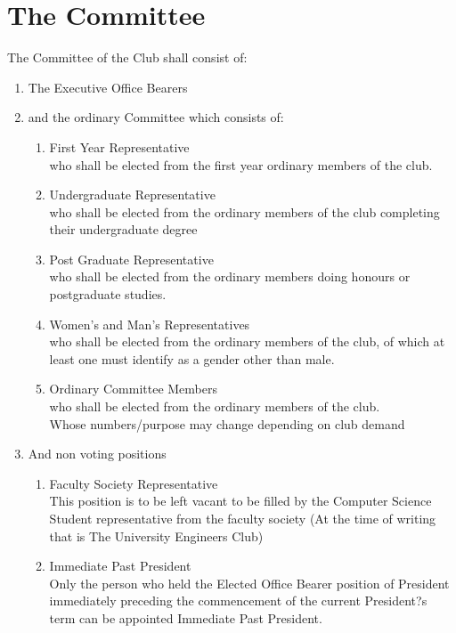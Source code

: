 \documentclass[10pt,a4paper]{report}
\begin{document}
	\section{The Committee}
	The Committee of the Club shall consist of:
	\begin{enumerate}[label=\alph*]
		\item The Executive Office Bearers
		\item and the ordinary Committee which consists of:
		\begin{enumerate}[label=\roman*]
			\item First Year Representative\\
			who shall be elected from the first year ordinary members of the club.
			\item Undergraduate Representative\\
			who shall be elected from the ordinary members of the club completing their undergraduate degree
			\item Post Graduate Representative\\
			who shall be elected from the ordinary members doing honours or postgraduate studies.
			\item Women's and Man's Representatives\\
			who shall be elected from the ordinary members of the club, of which at least one must identify as a gender other than male.
			\item Ordinary Committee Members\\
			who shall be elected from the ordinary members of the club.\\
			Whose numbers/purpose may change depending on club demand
		\end{enumerate}
		\item And non voting positions
		\begin{enumerate}
			\item Faculty Society Representative\\
			This position is to be left vacant to be filled by the Computer Science Student representative from the faculty society (At the time of writing that is The University Engineers Club)
			\item Immediate Past President\\
			Only the person who held the Elected Office Bearer position of President immediately preceding the commencement of the current President?s term can be appointed Immediate Past President.
		\end{enumerate}
	\end{enumerate}
\end{document}
